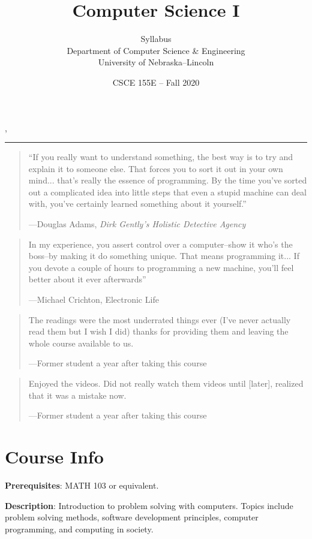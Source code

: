 \documentclass[12pt]{scrartcl}
\title{Computer Science I}\let\Title\@title
\subtitle{Syllabus\\
{\small
\vskip1cm
Department of Computer Science \& Engineering \\
University of Nebraska--Lincoln}
\vskip-1cm}
\date{CSCE 155E -- Fall 2020}
\begin{document}
\maketitle

\newwatermark[allpages=true,scale=5,textmark=Draft]{},

\hrule

\begin{quote}
``If you really want to understand something, the best way is to try and explain it to someone else. That forces you to sort it out in your own mind... that's really the essence of programming. By the time you've sorted out a complicated idea into little steps that even a stupid machine can deal with, you've certainly learned something about it yourself.'' 

\hfill ---Douglas Adams, \emph{Dirk Gently's Holistic Detective Agency}
\end{quote}

\begin{quote}
In my experience, you assert control over a computer--show it who's the boss--by making it do something unique. That means programming it... If you devote a couple of hours to programming a new machine, you'll feel better about it ever afterwards'' 

\hfill ---Michael Crichton, Electronic Life
\end{quote}

\begin{quote}
The readings were the most underrated things ever (I've never actually read them but I wish I did) thanks for providing them and leaving the whole course available to us. 

\hfill ---Former student a year after taking this course
\end{quote}

\begin{quote}
Enjoyed the videos. Did not really watch them videos until [later],
realized that it was a mistake now.

\hfill ---Former student a year after taking this course
\end{quote}

\section{Course Info}

\textbf{Prerequisites}: MATH 103 or equivalent.

\textbf{Description}: Introduction to problem solving with computers. 
Topics include problem solving methods, software development 
principles, computer programming, and computing in society.
\end{document}
